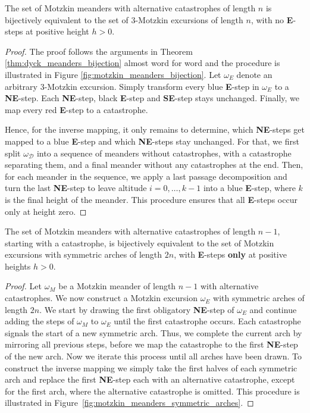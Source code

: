 \begin{theorem}
  The set of Motzkin meanders with alternative catastrophes of length $n$ is bijectively equivalent to the set of 3-Motzkin excursions of length $n$, with no \textbf{E}-steps at positive height $h > 0$.
\end{theorem}

\begin{proof}
  The proof follows the arguments in Theorem \ref{thm:dyck_meanders_bijection} almost word for word and the procedure is illustrated in Figure \ref{fig:motzkin_meanders_bijection}.
  Let $\omega_E$ denote an arbitrary 3-Motzkin excursion. 
  Simply transform every blue {\color{lightblue} \textbf{E}}-step in $\omega_E$ to a \textbf{NE}-step.
  Each \textbf{NE}-step, black \textbf{E}-step and \textbf{SE}-step stays unchanged.
  Finally, we map every red {\color{catred} \textbf{E}}-step to a catastrophe.

  Hence, for the inverse mapping, it only remains to determine, which \textbf{NE}-steps get mapped to a blue {\color{lightblue} \textbf{E}}-step and which \textbf{NE}-steps stay unchanged.
  For that, we first split $\omega_\mathcal{D}$ into a sequence of meanders without catastrophes, with a catastrophe separating them, and a final meander without any catastrophes at the end.
  Then, for each meander in the sequence, we apply a last passage decomposition and turn the last \textbf{NE}-step to leave altitude $i = 0, \dots, k - 1$ into a blue {\color{lightblue} \textbf{E}}-step, where $k$ is the final height of the meander. This procedure ensures that all \textbf{E}-steps occur only at height zero.
\end{proof}

\begin{theorem}
  The set of Motzkin meanders with alternative catastrophes of length $n-1$, starting with a catastrophe, is bijectively equivalent to the set of Motzkin excursions with symmetric arches of length $2n$, with \textbf{E}-steps \textbf{only} at positive heights $h > 0$.
\end{theorem}

\begin{proof}
  Let $\omega_M$ be a Motzkin meander of length $n-1$ with alternative catastrophes. We now construct a Motzkin excursion $\omega_E$ with symmetric arches of length $2n$. We start by drawing the first obligatory \textbf{NE}-step of $\omega_E$ and continue adding the steps of $\omega_M$ to $\omega_E$ until the first catastrophe occurs. Each catastrophe signals the start of a new symmetric arch. Thus, we complete the current arch by mirroring all previous steps, before we map the catastrophe to the first \textbf{NE}-step of the new arch.
  Now we iterate this process until all arches have been drawn.
  To construct the inverse mapping we simply take the first halves of each symmetric arch and replace the first \textbf{NE}-step each with an alternative catastrophe, except for the first arch, where the alternative catastrophe is omitted. This procedure is illustrated in Figure~\ref{fig:motzkin_meanders_symmetric_arches}.
\end{proof}

